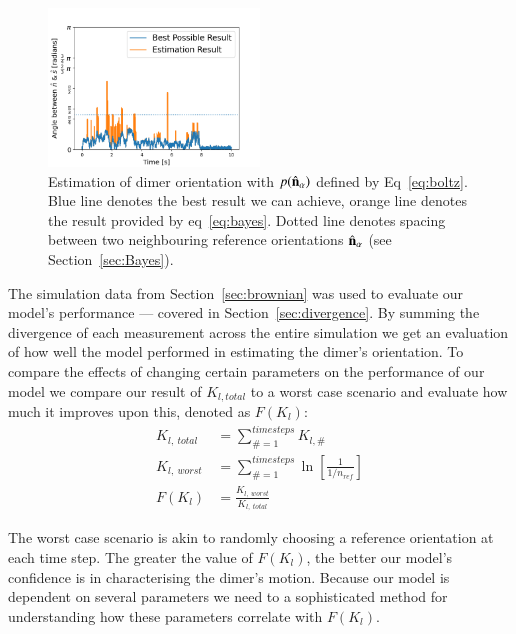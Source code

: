 \documentclass[final,  3p]{elsarticle}
\begin{document}
\begin{figure}[h]
\centering
\includegraphics[width=0.5\textwidth]{./Images/fig4.png}
\caption{\label{fig:biased}
%
Estimation of dimer orientation with $p(\hat{\bf n}_\alpha)$ defined
by Eq~\eqref{eq:boltz}.  Blue line denotes the best result we can
achieve, orange line denotes the result provided by eq~\ref{eq:bayes}.
Dotted line denotes spacing between two neighbouring reference
orientations $\hat{\bf n}_\alpha$ (see Section~\ref{sec:Bayes}).
}
\end{figure} 

The simulation data from Section~\ref{sec:brownian} was used to evaluate our model's performance --- covered in Section~\ref{sec:divergence}. By summing the divergence of each measurement across the entire simulation we get an evaluation of how well the model performed in estimating the dimer's orientation. To compare the effects of changing certain parameters on the performance of our model we compare our result of $K_{l,total}$ to a worst case scenario and evaluate how much it improves upon this, denoted as $F(K_l)$:
\begin{align}
  K_{l, \ total} &= \sum\limits_{\# =1}^{timesteps} K_{l,\#}
  \\
  K_{l, \ worst} &= \sum\limits_{\#=1}^{timesteps} \ln \left[\frac{1}{1/n_{ref}} \right]
  \\
F(K_l) &= \frac{K_{l,\ worst}}{K_{l, \ total}}
\end{align}

The worst case scenario is akin to randomly choosing a reference
orientation at each time step. The greater the value of $F(K_l)$, the
better our model's confidence is in characterising the dimer's
motion. Because our model is dependent on several parameters we need
to a sophisticated method for understanding how these parameters
correlate with $F(K_l)$.

\end{document}
